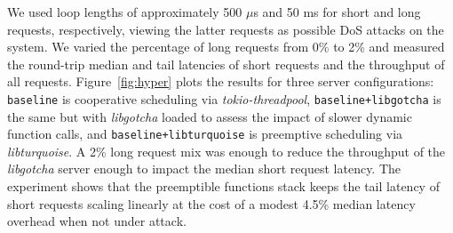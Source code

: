 We used loop lengths of approximately 500 $\mu$s and 50 ms for short and long requests,
respectively, viewing the latter requests as possible DoS attacks on the system.
We varied the percentage of long requests from 0\% to 2\% and measured the round-trip
median and tail latencies of short requests and the throughput of all requests.
Figure~\ref{fig:hyper} plots the results for three server configurations:\@
\texttt{baseline} is cooperative scheduling via \textit{tokio-threadpool},
\texttt{baseline+libgotcha} is the same but with \textit{libgotcha} loaded to assess
the
impact of slower dynamic function calls, and \texttt{baseline+libturquoise} is
preemptive
scheduling via \textit{libturquoise}.  A 2\% long request mix was enough to reduce
the throughput of the \textit{libgotcha} server enough to impact the
median short request latency.
The experiment shows that the preemptible
functions stack keeps the tail latency of short requests scaling linearly at the cost
of a
modest 4.5\% median latency overhead when not under attack.

